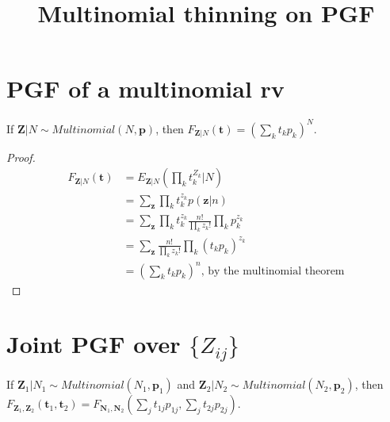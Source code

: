 \documentclass{article}
\title{Multinomial thinning on PGF}
\begin{document}
\maketitle

\section{PGF of a multinomial rv}
If $\mathbf{Z}|N \sim Multinomial(N, \mathbf{p})$, then $F_{\mathbf{Z}|N}(\mathbf{t}) = (\sum_k t_k p_k)^N$.

\begin{proof}
\begin{align*}
F_{\mathbf{Z}|N}(\mathbf{t}) &= E_{\mathbf{Z}|N}(\prod_k t_k^{Z_k}|N) \\
&= \sum_\mathbf{z} \prod_k t_k^{z_k} p(\mathbf{z}|n) \\
&= \sum_\mathbf{z} \prod_k t_k^{z_k} \frac{n!}{\prod_k z_k!} \prod_k p_k^{z_k} \\
&= \sum_\mathbf{z} \frac{n!}{\prod_k z_k!} \prod_k (t_k p_k)^{z_k} \\
&= (\sum_k t_k p_k)^n \text{, by the multinomial theorem}
\end{align*}
\end{proof}

\section{Joint PGF over $\{Z_{ij}\}$}
If $\mathbf{Z}_1|N_1 \sim Multinomial(N_1, \mathbf{p}_1)$ and $\mathbf{Z}_2|N_2 \sim Multinomial(N_2, \mathbf{p}_2)$, then $F_{\mathbf{Z}_1, \mathbf{Z}_2}(\mathbf{t}_1, \mathbf{t}_2) = F_{\mathbf{N}_1, \mathbf{N}_2}(\sum_j  t_{1j} p_{1j}, \sum_j t_{2j} p_{2j})$.
\end{document}
